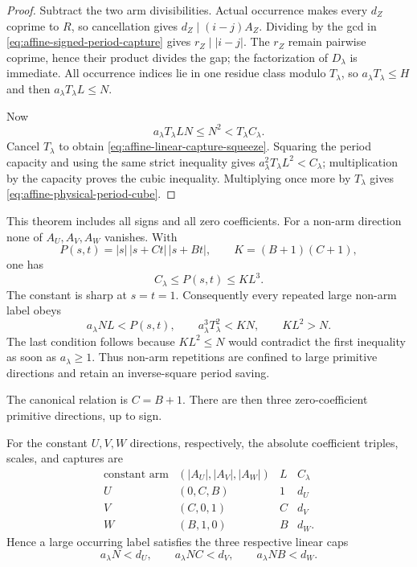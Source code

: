 \begin{proof}
Subtract the two arm divisibilities.  Actual occurrence makes every $d_Z$
coprime to $R$, so cancellation gives
$d_Z\mid(i-j)A_Z$.  Dividing by the gcd in
\eqref{eq:affine-signed-period-capture} gives $r_Z\mid|i-j|$.
The $r_Z$ remain pairwise coprime, hence their product divides the gap; the
factorization of $D_\lambda$ is immediate.  All occurrence indices lie in
one residue class modulo $T_\lambda$, so
$a_\lambda T_\lambda\le H$ and then
$a_\lambda T_\lambda L\le N$.

Now
\[
 a_\lambda T_\lambda LN\le N^2
       <T_\lambda C_\lambda.
\]
Cancel $T_\lambda$ to obtain
\eqref{eq:affine-linear-capture-squeeze}.  Squaring the period capacity and
using the same strict inequality gives
$a_\lambda^2T_\lambda L^2<C_\lambda$; multiplication by the capacity proves
the cubic inequality.  Multiplying once more by $T_\lambda$ gives
\eqref{eq:affine-physical-period-cube}.
\end{proof}

This theorem includes all signs and all zero coefficients.  For a non-arm
direction none of $A_U,A_V,A_W$ vanishes.  With
\begin{equation}\label{eq:affine-signed-direction-product}
 P(s,t)=|s|\,|s+Ct|\,|s+Bt|,\qquad K=(B+1)(C+1),
\end{equation}
one has
\begin{equation}\label{eq:affine-signed-product-bound}
 C_\lambda\le P(s,t)\le KL^3.
\end{equation}
The constant is sharp at $s=t=1$.  Consequently every repeated large
non-arm label obeys
\begin{equation}\label{eq:affine-nonarm-caps}
 a_\lambda NL<P(s,t),\qquad
 a_\lambda^3T_\lambda^2<KN,\qquad KL^2>N.
\end{equation}
The last condition follows because $KL^2\le N$ would contradict the first
inequality as soon as $a_\lambda\ge1$.  Thus non-arm repetitions are confined
to large primitive directions and retain an inverse-square period saving.

The canonical relation is $C=B+1$.  There are then three zero-coefficient
primitive directions, up to sign.

\begin{theorem}
\label{thm:affine-exact-three-arm-capture}
For the constant $U,V,W$ directions, respectively, the absolute coefficient
triples, scales, and captures are
\[
\begin{array}{c|c|c|c}
\text{constant arm}&(|A_U|,|A_V|,|A_W|)&L&C_\lambda\\ \hline
U&(0,C,B)&1&d_U\\
V&(C,0,1)&C&d_V\\
W&(B,1,0)&B&d_W.
\end{array}
\]
Hence a large occurring label satisfies the three respective linear caps
\begin{equation}\label{eq:affine-linear-three-arm-caps}
 a_\lambda N<d_U,\qquad
 a_\lambda NC<d_V,\qquad
 a_\lambda NB<d_W.
\end{equation}
\end{theorem}

